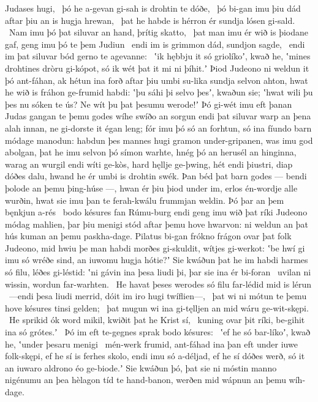 Judases hugi, \hld\ þó he a-gevan gi-sah
is drohtin te dóðe, \hld\ þó bi-gan imu þiu dád aftar þiu
an is hugja hrewan, \hld\ þat he habde is hérron ér
sundja lósen gi-sald. \hld\ Nam imu þó þat siluvar an hand,
þrítig skatto, \hld\ þat man imu ér wið is þiodane gaf,
geng imu þó te þem Judiun \hld\ endi im is grimmon dád,
sundjon sagde, \hld\ endi im þat siluvar bód
gerno te agevanne: \hld\ ʽik hębbju it só griolíkoʼ, kwað he,
ʽmines drohtines dròru gi-kópot,
só ik wét þat it mi ni þíhit.ʼ Þiod Judeono
ni weldun it þó ant-fáhan, ak hétun ina forð aftar þiu
umbi su-lika sundja selvon ahton,
hwat he wið is fráhon ge-frumid habdi:
ʽþu sáhi þi selvo þesʼ, kwaðun sie; ʽhwat wili þu þes nu sóken te ús?
Ne wít þu þat þesumu werode!ʼ Þó gi-wét imu eft þanan
Judas gangan te þemu godes wíhe
swíðo an sorgun endi þat siluvar warp
an þena alah innan, ne gi-dorste it égan leng;
fór imu þó só an forhtun, só ina fíundo barn
módage manodun: habdun þes mannes hugi
gramon under-gripanen, was imu god abolgan,
þat he imu selvon þó símon warhte,
hnég þó an herusél an hinginna,
warag an wurgil endi wíti ge-kòs,
hard hęllje ge-þwing, hét endi þiustri,
diap dóðes dalu, hwand he ér umbi is drohtin swék.
Þan béd þat barn godes — bendi þolode
an þemu þing-húse —, hwan ér þiu þiod under im,
erlos én-wordje alle wurðin,
hwat sie imu þan te ferah-kwálu frummjan weldin.
Þó þar an þem bęnkjun a-rés \hld\ bodo késures
fan Rúmu-burg endi geng imu wið þat ríki Judeono
módag mahlien, þar þiu menigi stód
aftar þemu hove hwarvon: ni weldun an þat hús kuman
an þemu paskha-dage. Pilatus bi-gan
frókno frágon ovar þat folk Judeono,
mid hwiu þe man habdi morðes gi-skuldit,
wítjes gi-werkot: ʽbe hwí gi imu só wréðe sind,
an iuwomu hugja hótie?ʼ Sie kwáðun þat he im habdi harmes só filu,
léðes gi-léstid: ʽni gávin ina þesa liudi þi,
þar sie ina ér bi-foran \hld\ uvilan ni wissin,
wordun far-warhten. \hld\ He havat þeses werodes só filu
far-lédid mid is lérun \hld\ —endi þesa liudi merrid,
dóit im iro hugi twíflien—, \hld\ þat wi ni mótun te þemu hove késures
tinsi gelden; \hld\ þat mugun wi ina gi-tęlljen an
mid wáru ge-wit-skępi. \hld\ He sprikid ók word mikil,
kwiðit þat he Krist sí, \hld\ kuning ovar þit ríki,
be-gihit ina só grótes.ʼ \hld\ Þó im eft te-gegnes sprak
bodo késures: \hld\ ʽef he só bar-líkoʼ, kwað he,
ʽunder þesaru menigi \hld\ mén-werk frumid,
ant-fáhad ina þan eft under iuwe folk-skępi, ef he sí is ferhes skolo,
endi imu só a-déljad, ef he sí dóðes werð,
só it an iuwaro aldrono éo ge-biode.ʼ
Sie kwáðun þó, þat sie ni móstin manno nigénumu
an þea hèlagon tíd te hand-banon,
werðen mid wápnun an þemu wíh-dage.
